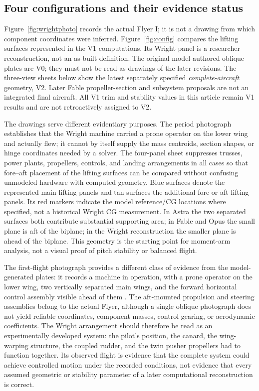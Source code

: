 \documentclass[11pt,a4paper]{article}
\begin{document}
\subsection{Four configurations and their evidence status}
Figure~\ref{fig:wrightphoto} records the actual Flyer I; it is not a drawing from which component coordinates were inferred. Figure~\ref{fig:config} compares the lifting surfaces represented in the V1 computations. Its Wright panel is a researcher reconstruction, not an as-built definition. The original model-authored oblique plates are V0; they must not be read as drawings of the later revisions. The three-view sheets below show the latest separately specified \emph{complete-aircraft} geometry, V2. Later Fable propeller-section and subsystem proposals are not an integrated final aircraft. All V1 trim and stability values in this article remain V1 results and are not retroactively assigned to V2.

The drawings serve different evidentiary purposes. The period photograph establishes that the Wright machine carried a prone operator on the lower wing and actually flew; it cannot by itself supply the mass centroids, section shapes, or hinge coordinates needed by a solver. The four-panel sheet suppresses trusses, power plants, propellers, controls, and landing arrangements in all cases so that fore--aft placement of the lifting surfaces can be compared without confusing unmodeled hardware with computed geometry. Blue surfaces denote the represented main lifting panels and tan surfaces the additional fore or aft lifting panels. Its red markers indicate the model reference/CG locations where specified, not a historical Wright CG measurement. In Astra the two separated surfaces both contribute substantial supporting area; in Fable and Opus the small plane is aft of the biplane; in the Wright reconstruction the smaller plane is ahead of the biplane. This geometry is the starting point for moment-arm analysis, not a visual proof of pitch stability or balanced flight.

The first-flight photograph provides a different class of evidence from the model-generated plates: it records a machine in operation, with a prone operator on the lower wing, two vertically separated main wings, and the forward horizontal control assembly visible ahead of them \cite{ref4,ref5}. The aft-mounted propulsion and steering assemblies belong to the actual Flyer, although a single oblique photograph does not yield reliable coordinates, component masses, control gearing, or aerodynamic coefficients. The Wright arrangement should therefore be read as an experimentally developed system: the pilot's position, the canard, the wing-warping structure, the coupled rudder, and the twin pusher propellers had to function together. Its observed flight is evidence that the complete system could achieve controlled motion under the recorded conditions, not evidence that every assumed geometric or stability parameter of a later computational reconstruction is correct.
\end{document}
